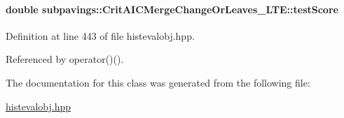 \hypertarget{classsubpavings_1_1CritAICMergeChangeOrLeaves__LTE_ab0fd379b75370697ec1f0264adf24ca6}{
\paragraph[{test\-Score}]{\setlength{\rightskip}{0pt plus 5cm}double {\bf subpavings\-::\-Crit\-A\-I\-C\-Merge\-Change\-Or\-Leaves\-\_\-\-L\-T\-E\-::test\-Score}}}\label{classsubpavings_1_1CritAICMergeChangeOrLeaves__LTE_ab0fd379b75370697ec1f0264adf24ca6}


\-Definition at line 443 of file histevalobj.\-hpp.



\-Referenced by operator()().



\-The documentation for this class was generated from the following file\-:\begin{DoxyCompactItemize}
\item 
\hyperlink{histevalobj_8hpp}{histevalobj.\-hpp}\end{DoxyCompactItemize}
